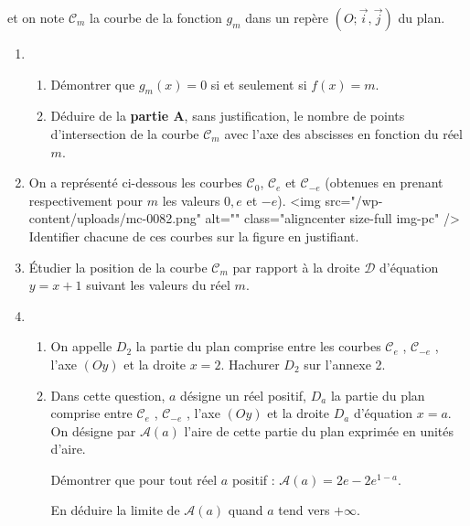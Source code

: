 \par
et on note $\mathscr C_{m}$ la courbe de la fonction $g_{m}$ dans un repère $\left(O; \vec{i}, \vec{j}\right)$ du plan.
\begin{enumerate}
     \item
     \begin{enumerate}[label=\alph*.]
          \item
          Démontrer que $g_{m}\left(x\right)=0$ si et seulement si $f\left(x\right)=m$.
          \item
     Déduire de la \textbf{partie A}, sans justification, le nombre de points d'intersection de la courbe $\mathscr C_{m}$ avec l'axe des abscisses en fonction du réel $m$.\end{enumerate}
     \item
     On a représenté ci-dessous les courbes $\mathscr C_{0}$, $\mathscr C_{e}$ et $\mathscr C_{-e}$ (obtenues en prenant respectivement pour $m$ les valeurs $0, e$ et $-e$).
     <img src="/wp-content/uploads/mc-0082.png" alt="" class="aligncenter size-full  img-pc" />
     Identifier chacune de ces courbes sur la figure en justifiant.
     \item
     Étudier la position de la courbe $\mathscr C_{m}$ par rapport à la droite $\mathscr D$ d'équation $y=x+1$ suivant les valeurs du réel $m$.
     \item
     \begin{enumerate}[label=\alph*.]
          \item
          On appelle $D_{2}$ la partie du plan comprise entre les courbes $\mathscr C_{e}$ , $\mathscr C_{-e}$ , l'axe $\left(Oy\right)$ et la droite $x=2$. Hachurer $D_{2}$ sur l'annexe 2.
          \item
          Dans cette question, $a$ désigne un réel positif, $D_{a}$ la partie du plan comprise entre $\mathscr C_{e}$ , $\mathscr C_{-e}$ , l'axe $\left(Oy\right)$ et la droite $D_{a}$ d'équation $x=a$. On désigne par $\mathscr A\left(a\right)$ l'aire de cette partie du plan exprimée en unités d'aire.
          \par
          Démontrer que pour tout réel $a$ positif : $\mathscr A\left(a\right)=2e-2e^{1-a}$.
          \par
     En déduire la limite de $\mathscr A\left(a\right)$ quand $a$ tend vers $+ \infty $.\end{enumerate}
\end{enumerate}
